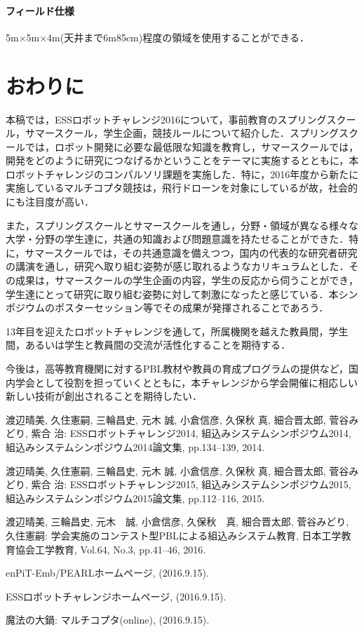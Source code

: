 \documentclass[submit]{ipsj}
\begin{document}
\paragraph*{フィールド仕様}
5m×5m×4m(天井まで6m85cm)程度の領域を使用することができる．

\section{おわりに}

本稿では，ESSロボットチャレンジ2016について，事前教育のスプリングスクール，サマースクール，学生企画，競技ルールについて紹介した．スプリングスクールでは，ロボット開発に必要な最低限な知識を教育し，サマースクールでは，開発をどのように研究につなげるかということをテーマに実施するとともに，本ロボットチャレンジのコンパルソリ課題を実施した．特に，2016年度から新たに実施しているマルチコプタ競技は，飛行ドローンを対象にしているが故，社会的にも注目度が高い．

また，スプリングスクールとサマースクールを通し，分野・領域が異なる様々な大学・分野の学生達に，共通の知識および問題意識を持たせることができた．特に，サマースクールでは，その共通意識を備えつつ，国内の代表的な研究者研究の講演を通し，研究へ取り組む姿勢が感じ取れるようなカリキュラムとした．その成果は，サマースクールの学生企画の内容，学生の反応から伺うことができ，学生達にとって研究に取り組む姿勢に対して刺激になったと感じている．本シンポジウムのポスターセッション等でその成果が発揮されることであろう．

13年目を迎えたロボットチャレンジを通して，所属機関を越えた教員間，学生間，あるいは学生と教員間の交流が活性化することを期待する．

今後は，高等教育機関に対するPBL教材や教員の育成プログラムの提供など，国内学会として役割を担っていくとともに，本チャレンジから学会開催に相応しい新しい技術が創出されることを期待したい．


\begin{thebibliography}{10}

 渡辺晴美, 久住憲嗣, 三輪昌史, 元木 誠, 小倉信彦, 久保秋 真, 細合晋太郎, 菅谷みどり, 紫合 治: ESSロボットチャレンジ2014, 組込みシステムシンポジウム2014, 組込みシステムシンポジウム2014論文集, pp.134--139, 2014.

	渡辺晴美, 久住憲嗣, 三輪昌史, 元木 誠, 小倉信彦, 久保秋 真, 細合晋太郎, 菅谷みどり, 紫合 治: ESSロボットチャレンジ2015, 組込みシステムシンポジウム2015, 組込みシステムシンポジウム2015論文集, pp.112--116, 2015.

 渡辺晴美, 三輪昌史, 元木　誠, 小倉信彦, 久保秋　真, 細合晋太郎, 菅谷みどり, 久住憲嗣: 学会実施のコンテスト型PBLによる組込みシステム教育, 日本工学教育協会工学教育, Vol.64, No.3, pp.41--46, 2016.

 enPiT-Emb/PEARLホームページ,  (2016.9.15).

 ESSロボットチャレンジホームページ,  (2016.9.15).

魔法の大鍋: マルチコプタ(online),
(2016.9.15).

\end{thebibliography}
\end{document}
